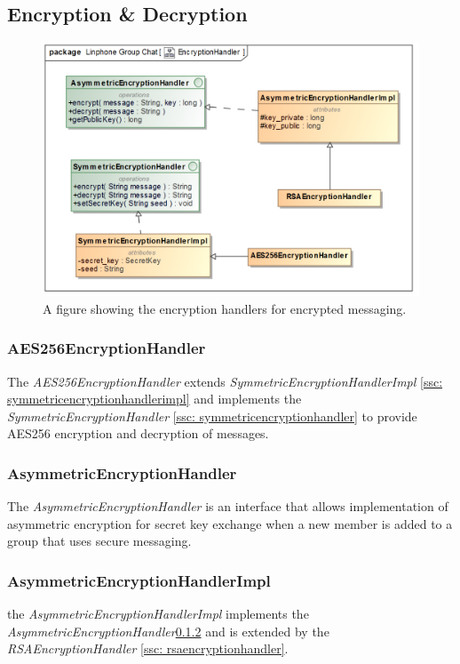 \documentclass[11pt]{article}
\begin{document}
\subsection{Encryption \& Decryption}

\begin{figure}[H]
	\centering
	\includegraphics[width=5in]{./images/class_encryption_handler.png}
	\caption[EncryptionHandlers]{A figure showing the encryption handlers for encrypted messaging.}
	\label{uml-encrypt-handler}
\end{figure}

\subsubsection{AES256EncryptionHandler}\label{ssc: aes256encryptionhandler}
The \textit{AES256EncryptionHandler} extends \textit{SymmetricEncryptionHandlerImpl} \ref{ssc: symmetricencryptionhandlerimpl} and implements the \textit{SymmetricEncryptionHandler} \ref{ssc: symmetricencryptionhandler} to provide AES256 encryption and decryption of messages. 
\subsubsection{AsymmetricEncryptionHandler}\label{ssc: asymmetricencryptionhandler}
The \textit{AsymmetricEncryptionHandler} is an interface that allows implementation of asymmetric encryption for secret key exchange when a new member is added to a group that uses secure messaging.
\subsubsection{AsymmetricEncryptionHandlerImpl}\label{ssc: asymmetricencryptionhandlerimpl}
the \textit{AsymmetricEncryptionHandlerImpl} implements the \textit{AsymmetricEncryptionHandler}\ref{ssc: asymmetricencryptionhandler} and is extended by the \textit{RSAEncryptionHandler} \ref{ssc: rsaencryptionhandler}.
\end{document}
